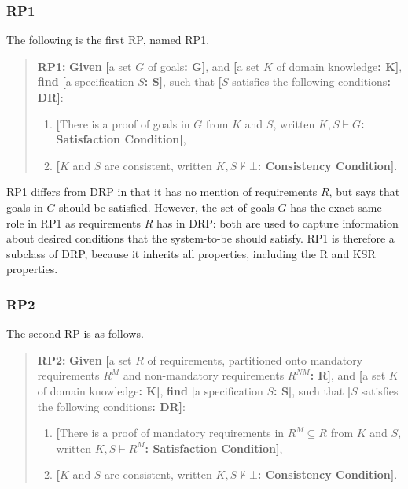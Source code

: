 \documentclass[graybox]{svmult}
\newcommand{\xb}[1]{\textbf{#1}}
\newcommand{\xf}[1]{\textsf{#1}}
\newcommand{\RP}{RP}
\newcommand{\ZJRP}{DRP}
\newcommand{\SatisfactionCondition}{Satisfaction Condition}
\newcommand{\ConsistencyCondition}{Consistency Condition}
\newcommand{\PrR}{\xf{R}}
\newcommand{\PrKSR}{\xf{KSR}}
\newcommand{\CLabel}[2]{\xb{[}#1\xb{: #2]}}
\begin{document}
\subsubsection{RP1} The following is the first \RP, named RP1.

\begin{quote}
    \xb{RP1:} \xb{Given} \CLabel{a set $G$ of goals}{G}, and \CLabel{a set $K$ of domain knowledge}{K}, \xb{find} \CLabel{a specification $S$}{S}, such that \CLabel{$S$ satisfies the following conditions}{DR}:
\begin{enumerate}
    \item{\CLabel{There is a proof of goals in $G$ from $K$ and $S$, written $K, S \vdash G$}{\SatisfactionCondition},}
    \item{\CLabel{$K$ and $S$ are consistent, written $K, S \not\vdash \bot$}{\ConsistencyCondition}.}
\end{enumerate}
\end{quote}

RP1 differs from \ZJRP{} in that it has no mention of requirements $R$, but says that goals in $G$ should be satisfied. However, the set of goals $G$ has the exact same role in RP1 as requirements $R$ has in \ZJRP: both are used to capture information about desired conditions that the system-to-be should satisfy. RP1 is therefore a subclass of \ZJRP, because it inherits all properties, including the \PrR{} and \PrKSR{} properties. 

\subsubsection{RP2} The second \RP{} is as follows.

\begin{quote}
    \xb{RP2:} \xb{Given} \CLabel{a set $R$ of requirements, partitioned onto mandatory requirements $R^{M}$ and non-mandatory requirements $R^{NM}$}{R}, and \CLabel{a set $K$ of domain knowledge}{K}, \xb{find} \CLabel{a specification $S$}{S}, such that \CLabel{$S$ satisfies the following conditions}{DR}:
\begin{enumerate}
    \item{\CLabel{There is a proof of mandatory requirements in $R^{M} \subseteq R$ from $K$ and $S$, written $K, S \vdash R^{M}$}{\SatisfactionCondition},}
    \item{\CLabel{$K$ and $S$ are consistent, written $K, S \not\vdash \bot$}{\ConsistencyCondition}.}
\end{enumerate}
\end{quote}
\end{document}
